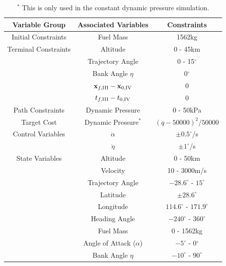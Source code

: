 \begin{table}[ht]
	\centering
\begin{tabular}{|c|c|c|}
	\hline \textbf{Variable Group}  & \textbf{Associated Variables} & \textbf{Constraints}\\
	\hline Initial Constraints  & Fuel Mass & 1562kg\\ 
	\hline Terminal Constraints & Altitude & 0 - 45km\\ & Trajectory Angle& 0 - 15$^\circ$\\  & Bank Angle $\eta$& 0$^\circ$\\  & $\textbf{x}_{f,\textrm{\rom{3}}} - \textbf{x}_{0,\textrm{\rom{4}}}$ & 0\\ & $t_{f,\textrm{\rom{3}}} - t_{0,\textrm{\rom{4}}}$ & 0\\
	\hline Path Constraints & Dynamic Pressure& 0 - 50kPa\\ 
	\hline Target Cost & Dynamic Pressure$^*$ & $(q-50000)^2/50000$\\ 
			\hline Control Variables & $\dot{\alpha}$ &  $\pm0.5^\circ$/s\\  & $\dot{\eta}$ &  $\pm1^\circ$/s\\ 
			\hline State Variables & Altitude & 0 - 50km\\ & Velocity& 10 - 3000m/s\\ & Trajectory Angle& $-28.6^\circ$ - $15^\circ$\\   & Latitude&$\pm28.6^\circ$ \\  & Longitude& $114.6^\circ$ - $171.9^\circ$\\   & Heading Angle& $-240^\circ$ - $360^\circ$ \\  & Fuel Mass& 0 - 1562kg \\  & Angle of Attack ($\alpha$)&  $-5^\circ$ - 0$^\circ$\\  & Bank Angle $\eta$& $-10^\circ$ - $90^\circ$ \\  
	\hline 
\end{tabular} 
\caption{$^*$ This is only used in the constant dynamic pressure simulation.}
\end{table}

